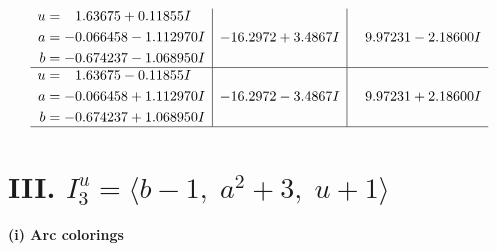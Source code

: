 \documentclass[1p]{elsarticle_modified}
\theoremstyle{definition}
\begin{document}
$$\begin{array}{c|c|c}
\begin{aligned}
u &= \phantom{-}1.63675 + 0.11855 I \\
a &= -0.066458 - 1.112970 I \\
b &= -0.674237 - 1.068950 I\end{aligned}
 & -16.2972 + 3.4867 I & \phantom{-}9.97231 - 2.18600 I \\ \hline\begin{aligned}
u &= \phantom{-}1.63675 - 0.11855 I \\
a &= -0.066458 + 1.112970 I \\
b &= -0.674237 + 1.068950 I\end{aligned}
 & -16.2972 - 3.4867 I & \phantom{-}9.97231 + 2.18600 I\\
 \hline 
 \end{array}$$\newpage\newpage\renewcommand{\arraystretch}{1}
\centering \section*{III. $I^u_{3}= \langle b-1,\;a^2+3,\;u+1 \rangle$}
\flushleft \textbf{(i) Arc colorings}\\
\end{document}
